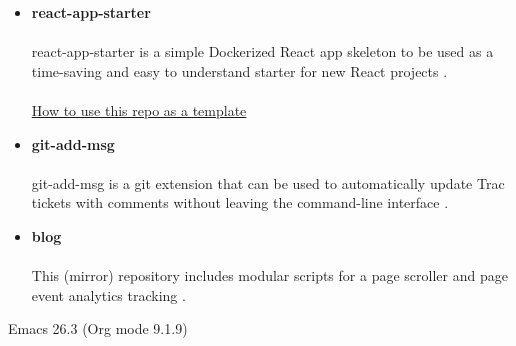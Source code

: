 \documentclass[11pt]{article}
\begin{document}
\begin{itemize}
\paragraph{}
A catalog of GitHub open source projects by Heini Fagerlund (@hfagerlund) in \TeX{}, org, and PDF formats \cite{osprojects}. Created using Emacs.
\item \textbf{react-app-starter}
\paragraph{}
react-app-starter is a simple Dockerized React app skeleton to be used as a time-saving and easy to understand starter for new React projects \cite{react-app-starter}.
\paragraph{}
\href{https://docs.github.com/en/github/creating-cloning-and-archiving-repositories/creating-a-repository-on-github/creating-a-repository-from-a-template}{How to use this repo as a template}
\item \textbf{git-add-msg}
\paragraph{}
git-add-msg is a git extension that can be used to automatically update Trac tickets with comments without leaving the command-line interface \cite{git-add-msg}.
\item \textbf{blog}
\paragraph{}
This (mirror) repository includes modular scripts for a page scroller and page event analytics tracking \cite{blog}.
\end{itemize}

\begin{LaTeX}
\begin{sloppypar}


\end{sloppypar}
\end{LaTeX}
Emacs 26.3 (Org mode 9.1.9)
\end{document}
